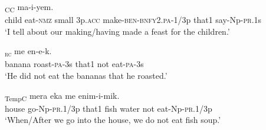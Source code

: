 \ea%
\label{ex:5:x1260}
\textsubscript{CC}  ma-i-yem.
 \\
     child  eat-\textsc{nmz}  small  3p.\textsc{acc}  make-\textsc{ben}-\textsc{bnfy}2.\textsc{pa}-1/3p that1  say-Np-\textsc{pr}.1s \\
\glt `I tell about our making/having made a feast for the children.'
\z

\ea%
\label{ex:5:x1261}
\textsubscript{\textsc{rc}}  me  en-e-k. \\
     banana  roast-\textsc{pa}-3s  that1  not  eat-\textsc{pa}-3s \\
\glt `He did not eat the bananas that he roasted.'
\z

\ea%
\label{ex:5:x1940}
\textsubscript{TempC}  mera  eka  me  enim-i-mik. \\
     house  go-Np-\textsc{pr}.1/3p  that1  fish  water  not  eat-Np-\textsc{pr}.1/3p \\
\glt `When/After we go into the house, we do not eat fish soup.'
\z
